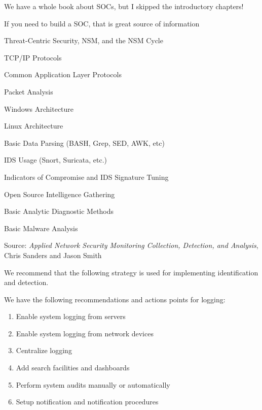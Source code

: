 \documentclass[Screen16to9,17pt]{foils}
\begin{document}
\begin{list2}
  \item We have a whole book about SOCs, but I skipped the introductory chapters!
  \item If you need to build a SOC, that is great source of information
\end{list2}


\begin{list2}\small
\item Threat-Centric Security, NSM, and the NSM Cycle
\item TCP/IP Protocols
\item Common Application Layer Protocols
\item Packet Analysis
\item Windows Architecture
\item Linux Architecture
\item Basic Data Parsing (BASH, Grep, SED, AWK, etc)
\item IDS Usage (Snort, Suricata, etc.)
\item Indicators of Compromise and IDS Signature Tuning
\item Open Source Intelligence Gathering
\item Basic Analytic Diagnostic Methods
\item Basic Malware Analysis
\end{list2}

Source: \emph{Applied Network Security Monitoring Collection, Detection, and Analysis}, Chris Sanders and Jason Smith


We recommend that the following strategy is used for implementing identification and detection.

We have the following recommendations and actions points for logging:
\begin{enumerate}
\item[\faSquareO] Enable system logging from servers
\item[\faSquareO] Enable system logging from network devices
\item[\faSquareO] Centralize logging
\item[\faSquareO] Add search facilities and dashboards
\item[\faSquareO] Perform system audits manually or automatically
\item[\faSquareO] Setup notification and notification procedures
\end{enumerate}
\end{document}
